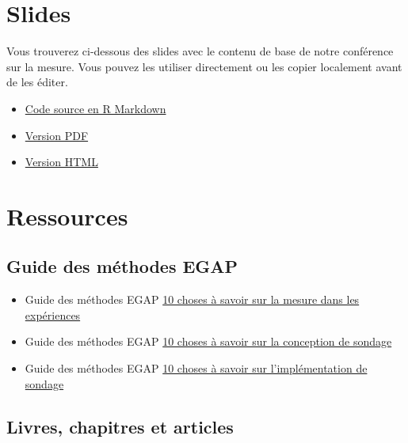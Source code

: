 \documentclass[
  12pt,
]{book}
\begin{document}
\hypertarget{slides-6}{%
\section{Slides}\label{slides-6}}

Vous trouverez ci-dessous des slides avec le contenu de base de notre conférence sur la mesure. Vous pouvez les utiliser directement ou les copier localement avant de les éditer.

\begin{itemize}
\item
  \href{https://egap.github.io/learningdays-resources/Slides/measurement-slides.Rmd}{Code source en R Markdown}
\item
  \href{https://egap.github.io/learningdays-resources/Slides/measurement-slides.pdf}{Version PDF}
\item
  \href{https://egap.github.io/learningdays-resources/Slides/measurement-slides.html}{Version HTML}
\end{itemize}

\hypertarget{ressources-6}{%
\section{Ressources}\label{ressources-6}}

\hypertarget{guide-des-muxe9thodes-egap-6}{%
\subsection{Guide des méthodes EGAP}\label{guide-des-muxe9thodes-egap-6}}

\begin{itemize}
\item
  Guide des méthodes EGAP \href{https://egap.org/resource/10-things-to-know-about-measurement-in-experiments/}{10 choses à savoir sur la mesure dans les expériences}
\item
  Guide des méthodes EGAP \href{https://egap.org/resource/10-things-to-know-about-survey-design/}{10 choses à savoir sur la conception de sondage}
\item
  Guide des méthodes EGAP \href{https://egap.org/resource/10-things-to-know-about-survey-implementation/}{10 choses à savoir sur l'implémentation de sondage}
\end{itemize}

\hypertarget{livres-chapitres-et-articles-4}{%
\subsection{Livres, chapitres et articles}\label{livres-chapitres-et-articles-4}}
\end{document}
